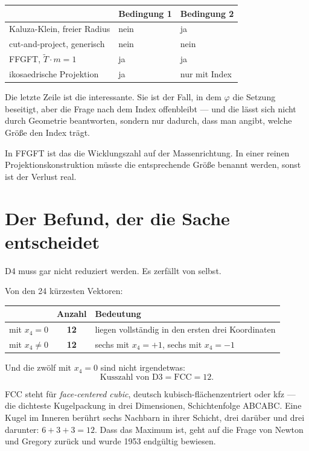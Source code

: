 \documentclass[11pt]{report}
\begin{document}
\begin{center}
\begin{tabular}{lll}
\toprule
 & Bedingung 1 & Bedingung 2 \\
\midrule
Kaluza-Klein, freier Radius & nein & ja \\
cut-and-project, generisch & nein & nein \\
FFGFT, $\tilde T \cdot m = 1$ & ja & ja \\
ikosaedrische Projektion & ja & nur mit Index \\
\bottomrule
\end{tabular}
\end{center}

Die letzte Zeile ist die interessante. Sie ist der Fall, in dem
$\varphi$ die Setzung beseitigt, aber die Frage nach dem Index
offenbleibt --- und die lässt sich nicht durch Geometrie beantworten,
sondern nur dadurch, dass man angibt, welche Größe den Index trägt.

In FFGFT ist das die Wicklungszahl auf der Massenrichtung. In einer
reinen Projektionskonstruktion müsste die entsprechende Größe benannt
werden, sonst ist der Verlust real.

\chapter{Der Befund, der die Sache entscheidet}

D4 muss gar nicht reduziert werden. Es zerfällt von selbst.

Von den 24 kürzesten Vektoren:
\begin{center}
\begin{tabular}{lcl}
\toprule
 & Anzahl & Bedeutung \\
\midrule
mit $x_4 = 0$ & \textbf{12} & liegen vollständig in den ersten drei Koordinaten \\
mit $x_4 \neq 0$ & \textbf{12} & sechs mit $x_4 = +1$, sechs mit $x_4 = -1$ \\
\bottomrule
\end{tabular}
\end{center}

Und die zwölf mit $x_4 = 0$ sind nicht irgendetwas:
\[
  \text{Kusszahl von D3} = \text{FCC} = 12 .
\]

FCC steht für \emph{face-centered cubic}, deutsch
kubisch-flächenzentriert oder kfz --- die dichteste Kugelpackung in
drei Dimensionen, Schichtenfolge ABCABC. Eine Kugel im Inneren berührt
sechs Nachbarn in ihrer Schicht, drei darüber und drei darunter:
$6 + 3 + 3 = 12$. Dass das Maximum ist, geht auf die Frage von Newton
und Gregory zurück und wurde 1953 endgültig bewiesen.
\end{document}
